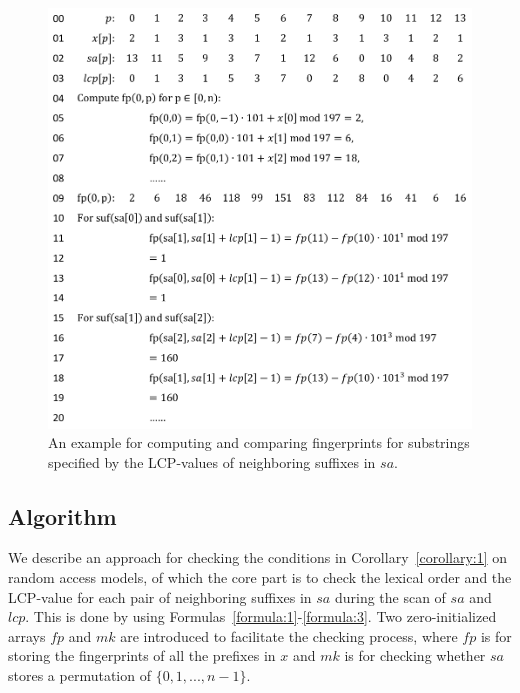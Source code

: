 \documentclass[10pt,journal,compsoc]{IEEEtran}
\begin{document}
\begin{figure}
	\centering
	
	\includegraphics[width = 0.9\columnwidth]{example}
	\caption{An example for computing and comparing fingerprints for substrings specified by the LCP-values of neighboring suffixes in $sa$. \label{fig:example}}	
\end{figure}

\subsection{Algorithm} \label{sec:method1:algorithm}

We describe an approach for checking the conditions in Corollary~\ref{corollary:1} on random access models, of which the core part is to check the lexical order and the LCP-value for each pair of neighboring suffixes in $sa$ during the scan of $sa$ and $lcp$. This is done by using Formulas~\ref{formula:1}-\ref{formula:3}. Two zero-initialized arrays $fp$ and $mk$ are introduced to facilitate the checking process, where $fp$ is for storing the fingerprints of all the prefixes in $x$ and $mk$ is for checking whether $sa$ stores a permutation of $\{0, 1, ..., n - 1\}$.
\end{document}
